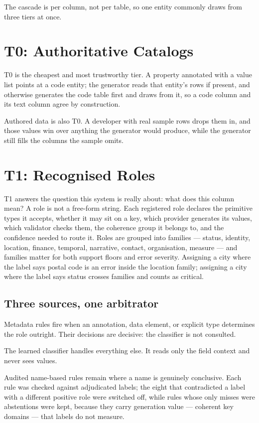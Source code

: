 \documentclass[journal]{IEEEtran}
\begin{document}
The cascade is per column, not per table, so one entity commonly draws
from three tiers at once.

\section{T0: Authoritative Catalogs}
\label{sec:t0}

T0 is the cheapest and most trustworthy tier. A property annotated with
a value list points at a code entity; the generator reads that entity's
rows if present, and otherwise generates the code table first and draws
from it, so a code column and its text column agree by construction.

Authored data is also T0. A developer with real sample rows drops them
in, and those values win over anything the generator would produce,
while the generator still fills the columns the sample omits.

\section{T1: Recognised Roles}
\label{sec:t1}

T1 answers the question this system is really about: what does this
column mean? A role is not a free-form string. Each registered role
declares the primitive types it accepts, whether it may sit on a key,
which provider generates its values, which validator checks them, the
coherence group it belongs to, and the confidence needed to route it.
Roles are grouped into families --- status, identity, location, finance,
temporal, narrative, contact, organisation, measure --- and families
matter for both support floors and error severity. Assigning a city
where the label says postal code is an error inside the location family;
assigning a city where the label says status crosses families and counts
as critical.

\subsection{Three sources, one arbitrator}

Metadata rules fire when an annotation, data element, or explicit type
determines the role outright. Their decisions are decisive: the
classifier is not consulted.

The learned classifier handles everything else. It reads only the field
context and never sees values.

Audited name-based rules remain where a name is genuinely conclusive.
Each rule was checked against adjudicated labels; the eight that
contradicted a label with a different positive role were switched off,
while rules whose only misses were abstentions were kept, because they
carry generation value --- coherent key domains --- that labels do not
measure.
\end{document}
